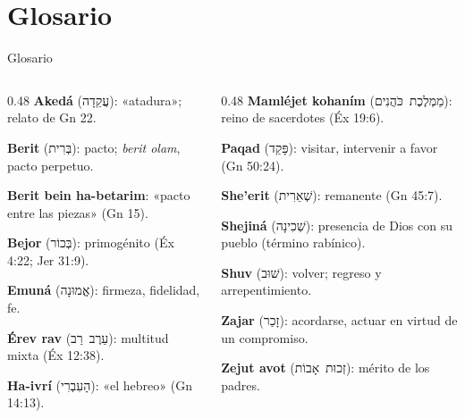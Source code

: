 \documentclass[hyperref={bookmarks=false},aspectratio=169]{beamer}
\newcommand{\heb}[1]{\mbox{\foreignlanguage{hebrew}{#1}}}
\begin{document}
\section{Glosario}
\begin{frame}{Glosario}
\begin{columns}[T,onlytextwidth]
\begin{column}{0.48\textwidth}\footnotesize
\textbf{Akedá} (\heb{עֲקֵדָה}): «atadura»; relato de Gn 22.\par\smallskip
\textbf{Berit} (\heb{בְּרִית}): pacto; \emph{berit olam}, pacto perpetuo.\par\smallskip
\textbf{Berit bein ha-betarim}: «pacto entre las piezas» (Gn 15).\par\smallskip
\textbf{Bejor} (\heb{בְּכוֹר}): primogénito (Éx 4:22; Jer 31:9).\par\smallskip
\textbf{Emuná} (\heb{אֱמוּנָה}): firmeza, fidelidad, fe.\par\smallskip
\textbf{Érev rav} (\heb{עֵרֶב רַב}): multitud mixta (Éx 12:38).\par\smallskip
\textbf{Ha-ivrí} (\heb{הָעִבְרִי}): «el hebreo» (Gn 14:13).
\end{column}
\begin{column}{0.48\textwidth}\footnotesize
\textbf{Mamléjet kohaním} (\heb{מַמְלֶכֶת כֹּהֲנִים}): reino de sacerdotes (Éx 19:6).\par\smallskip
\textbf{Paqad} (\heb{פָּקַד}): visitar, intervenir a favor (Gn 50:24).\par\smallskip
\textbf{She'erit} (\heb{שְׁאֵרִית}): remanente (Gn 45:7).\par\smallskip
\textbf{Shejiná} (\heb{שְׁכִינָה}): presencia de Dios con su pueblo (término rabínico).\par\smallskip
\textbf{Shuv} (\heb{שׁוּב}): volver; regreso y arrepentimiento.\par\smallskip
\textbf{Zajar} (\heb{זָכַר}): acordarse, actuar en virtud de un compromiso.\par\smallskip
\textbf{Zejut avot} (\heb{זְכוּת אָבוֹת}): mérito de los padres.
\end{column}
\end{columns}
\end{frame}

\end{document}
